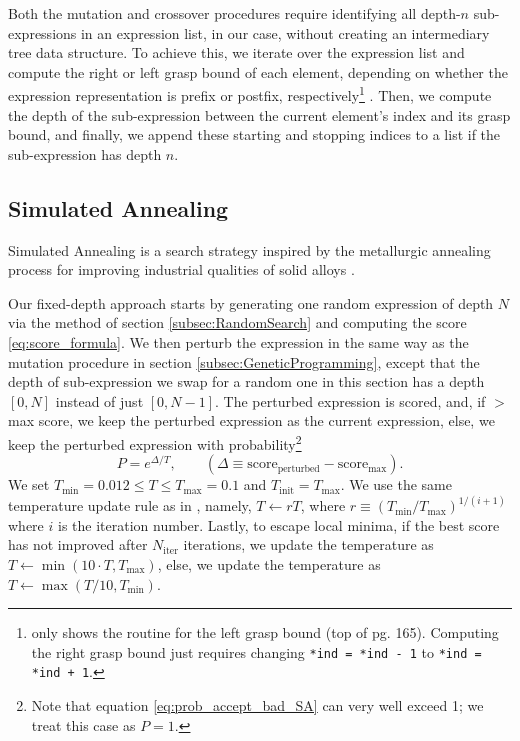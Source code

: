 \documentclass[runningheads]{llncs}
\begin{document}
\par Both the mutation and crossover procedures require identifying all depth-$n$ sub-expressions in an expression list, in our case, without creating an intermediary tree data structure. To achieve this, we iterate over the expression list and compute the right or left grasp bound of each element, depending on whether the expression representation is prefix or postfix, respectively\footnote{\cite{3ce09117-c08b-3ddb-b2ba-3ea8005b2118} only shows the routine for the left grasp bound (top of pg. 165). Computing the right grasp bound just requires changing \texttt{*ind = *ind - 1} to \texttt{*ind = *ind + 1}.} \cite{3ce09117-c08b-3ddb-b2ba-3ea8005b2118}. Then, we compute the depth of the sub-expression between the current element's index and its grasp bound, and finally, we append these starting and stopping indices to a list if the sub-expression has depth $n$.

\subsection{Simulated Annealing} \label{subsec:SimulatedAnnealing}
Simulated Annealing is a search strategy inspired by the metallurgic annealing process for improving industrial qualities of solid alloys \cite{vanLaarhoven1987} \cite{10.1145/3449639.3459345}. 
\par Our fixed-depth approach starts by generating one random expression of depth $N$ via the method of section \ref{subsec:RandomSearch} and computing the score \ref{eq:score_formula}. We then perturb the expression in the same way as the mutation procedure in section \ref{subsec:GeneticProgramming}, except that the depth of sub-expression we swap for a random one in this section has a depth $[0,N]$ instead of just $[0,N-1]$. The perturbed expression is scored, and, if $>$ max score, we keep the perturbed expression as the current expression, else, we keep the perturbed expression with probability\footnote{Note that equation \ref{eq:prob_accept_bad_SA} can very well exceed 1; we treat this case as $P=1$.} \cite{10.1145/3449639.3459345}
\begin{equation}
		P = e^{\Delta/T}, \qquad (\Delta \equiv \mathrm{score}_{\mathrm{perturbed}} -   \mathrm{score}_{\mathrm{max}}). \label{eq:prob_accept_bad_SA}
\end{equation}
We set $T_{\mathrm{min}} = 0.012 \leq T \leq T_{\mathrm{max}} = 0.1$ and $T_{\mathrm{init}} = T_{\mathrm{max}}$. We use the same temperature update rule as in \cite{10.1145/3449639.3459345}, namely, $T \gets rT$, where $r \equiv \left(T_{\mathrm{min}}/T_{\mathrm{max}}\right)^{1/(i+1)}$ where $i$ is the iteration number. Lastly, to escape local minima, if the best score has not improved after $N_{\mathrm{iter}}$ iterations, we update the temperature as $T \gets \min{\left(10\cdot T, T_{\mathrm{max}}\right)}$, else, we update the temperature as $T \gets \max{\left(T/10, T_{\mathrm{min}}\right)}$.
\end{document}

